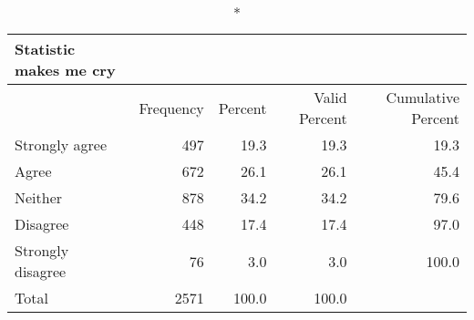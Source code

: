 \documentclass[
]{article}
\begin{document}
\begin{longtable}{l|rrrr}
\caption*{
{\large Statistic makes me cry}
} \\ 
\toprule
\multicolumn{1}{l}{} & Frequency & Percent & Valid Percent & Cumulative Percent \\ 
\midrule\addlinespace[2.5pt]
Strongly agree & 497 & 19.3 & 19.3 & 19.3 \\ 
Agree & 672 & 26.1 & 26.1 & 45.4 \\ 
Neither & 878 & 34.2 & 34.2 & 79.6 \\ 
Disagree & 448 & 17.4 & 17.4 & 97.0 \\ 
Strongly disagree & 76 & 3.0 & 3.0 & 100.0 \\ 
Total & 2571 & 100.0 & 100.0 &  \\ 
\bottomrule
\end{longtable}
\end{document}
